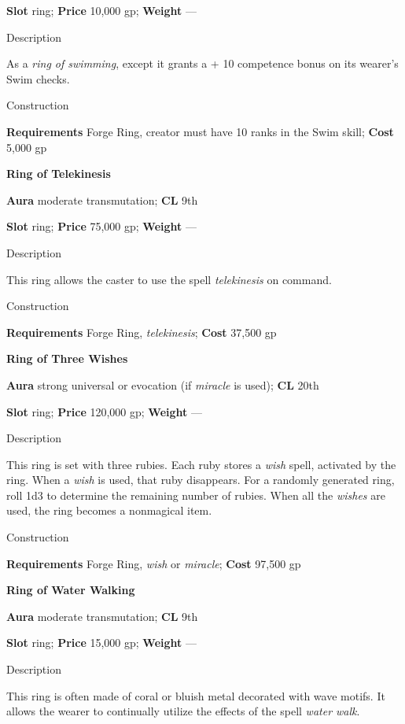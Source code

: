 \textbf{Slot} ring; \textbf{Price} 10,000 gp; \textbf{Weight} ---
				
Description
				
As a \textit{ring of swimming}, except it grants a +
10 competence
 bonus on its wearer's Swim checks. 
				
Construction
				
\textbf{Requirements} Forge Ring, creator must have 10 ranks in the Swim skill; \textbf{Cost }5,000 gp
				
\textbf{Ring of Telekinesis}
				
\textbf{Aura} moderate transmutation;\textbf{ CL }9th
				
\textbf{Slot} ring; \textbf{Price} 75,000 gp; \textbf{Weight} ---
				
Description
				
This ring allows the caster to use the spell \textit{telekinesis }on command. 
				
Construction
				
\textbf{Requirements} Forge Ring, \textit{telekinesis}; \textbf{Cost }37,500 gp
				
\textbf{Ring of Three Wishes}
				
\textbf{Aura} strong universal or evocation (if \textit{miracle }is used);\textbf{ CL }20th
				
\textbf{Slot} ring; \textbf{Price} 120,000 gp; \textbf{Weight} ---
				
Description
				
This ring is set with three rubies. Each ruby stores a \textit{wish }spell, activated by the ring. When a \textit{wish }is used, that ruby disappears. For a randomly generated ring, roll 1d3 to determine the remaining number of rubies. When all the \textit{wishes }are used, the ring becomes a nonmagical item. 
				
Construction
				
\textbf{Requirements} Forge Ring, \textit{wish} or \textit{miracle}; \textbf{Cost }97,500 gp
				
\textbf{Ring of Water Walking}
				
\textbf{Aura} moderate transmutation;\textbf{ CL }9th
				
\textbf{Slot} ring; \textbf{Price} 15,000 gp; \textbf{Weight} ---
				
Description
				
This ring is often made of coral or bluish metal decorated with wave motifs. It allows the wearer 
to continually utilize
 the effects of the spell \textit{water walk}. 
				
